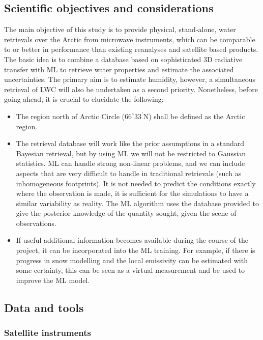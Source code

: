 \documentclass[12pt,oneside,a4paper]{article}
\begin{document}
\subsection{Scientific objectives and considerations}
The main objective of this study is to provide physical, stand-alone, water retrievals over the Arctic from microwave instruments, which can be comparable to or better in performance than existing reanalyses and satellite based products. The basic idea is to combine a database based on sophisticated 3D radiative transfer with ML to retrieve water properties and estimate the associated uncertainties. The primary aim is to estimate humidity, however, a simultaneous retrieval of LWC will also be undertaken as a second priority. Nonetheless, before going ahead, it is crucial to elucidate the following:
\begin{itemize}
\item The region north of Arctic Circle ($66^{\circ}33^{'}$N) shall be defined as the Arctic region.	
\item The retrieval database will work like the prior assumptions in a standard   Bayesian retrieval, but by using ML we will not be restricted to Gaussian statistics. ML can handle strong non-linear problems, and we can include   aspects that are very difficult to handle in traditional retrievals (such as  inhomogeneous footprints). It is not needed to predict the conditions exactly where the observation is made, it is sufficient for the simulations to have a  similar variability as reality. The ML algorithm uses the database provided to give the posterior knowledge of the quantity sought, given the scene of observations.
\item If useful additional information becomes available during the course of the project, it can be incorporated into the ML training. For example, if there is progress in snow modelling and the local emissivity can be estimated with  some certainty, this can be seen as a virtual measurement and be used to improve the ML model.
\end{itemize}

\subsection{Data and tools}
% 
\subsubsection{Satellite instruments}
\end{document}

